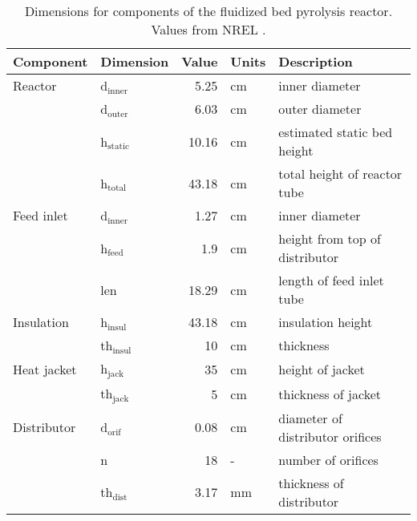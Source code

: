\begin{table}[H]
    \centering
    \caption{Dimensions for components of the fluidized bed pyrolysis reactor. Values from NREL \cite{French-2019}.}
    \label{tab:dimensions}
    \begin{tabular}{llrll}
        \toprule
        Component & Dimension & Value & Units & Description \\
        \midrule
        Reactor
            & d$_\textrm{inner}$ & 5.25 & cm & inner diameter \\
            & d$_\textrm{outer}$ & 6.03 & cm & outer diameter \\
            & h$_\textrm{static}$ & 10.16 & cm & estimated static bed height \\
            & h$_\textrm{total}$ & 43.18 & cm & total height of reactor tube \\
        Feed inlet
            & d$_\textrm{inner}$ & 1.27 & cm & inner diameter \\
            & h$_\textrm{feed}$ & 1.9 & cm & height from top of distributor \\
            & len & 18.29 & cm & length of feed inlet tube \\
        Insulation
            & h$_\textrm{insul}$ & 43.18 & cm & insulation height \\
            & th$_\textrm{insul}$ & 10 & cm & thickness \\
        Heat jacket
            & h$_\textrm{jack}$ & 35 & cm & height of jacket \\
            & th$_\textrm{jack}$ & 5 & cm & thickness of jacket \\
        Distributor
            & d$_\textrm{orif}$ & 0.08 & cm & diameter of distributor orifices \\
            & n & 18 & - & number of orifices \\
            & th$_\textrm{dist}$ & 3.17 & mm & thickness of distributor \\
        \bottomrule
    \end{tabular}
\end{table}

